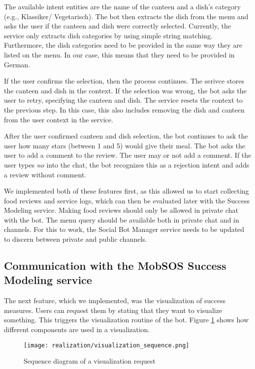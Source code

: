 The available intent entities are the name of the canteen and a dish's category (e.g., Klassiker/ Vegetarisch).
The bot then extracts the dish from the menu and asks the user if the canteen and dish were correctly selected. 
Currently, the service only extracts dish categories by using simple string matching. Furthermore, the dish categories need to be provided in the same way they are listed on the menu. In our case, this means that they need to be provided in German.

If the user confirms the selection, then the process continues. 
The serivce stores the canteen and dish in the context. 
If the selection was wrong, the bot asks the user to retry, specifying the canteen and dish. 
The service resets the context to the previous step. In this case, this also includes removing the dish and canteen from the user context in the service.

After the user confirmed canteen and dish selection, the bot continues to ask the user how many stars (between 1 and 5) would give their meal. 
The bot asks the user to add a comment to the review. The user may or not add a comment. If the user types \emph{no} into the chat, the bot recognizes this as a rejection intent and adds a review without comment.

We implemented both of these features first, as this allowed us to start collecting food reviews and service logs, which can then be evaluated later with the Success Modeling service.
Making food reviews should only be allowed in private chat with the bot. 
The menu query should be available both in private chat and in channels.
For this to work, the Social Bot Manager service needs to be updated to discern between private and public channels.

\subsection{Communication with the MobSOS Success Modeling service}
The next feature, which we implemented, was the visualization of success measures. Users can request them by stating that they want to visualize something.
This triggers the visualization routine of the bot. Figure \ref{fig:visualReqSeq} shows how different components are used in a visualization.
\begin{figure}[h]
    \centering
    \texttt{[image: realization/visualization\_sequence.png]}
    \caption{Sequence diagram of a visualization request}
    \label{fig:visualReqSeq}
\end{figure}

